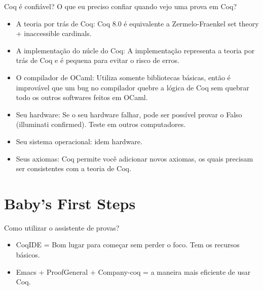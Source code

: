 \documentclass[presentation]{beamer}
\begin{document}
\begin{frame}[label={sec:orgd3a054b}]{Coq é confiável?}
O que eu preciso confiar quando vejo uma prova em Coq? 
\begin{itemize}
\item \alert{A teoria por trás de Coq}: Coq 8.0 é equivalente a Zermelo-Fraenkel set theory + inaccessible cardinals.
\item \alert{A implementação do núcle do Coq}: A implementação representa a teoria por trás de Coq e é pequena para evitar o risco de erros.
\item \alert{O compilador de OCaml}: Utiliza somente bibliotecas básicas, então é improvável que um bug no compilador quebre a lógica de Coq sem quebrar todo os outros softwares feitos em OCaml.
\item \alert{Seu hardware}: Se o seu hardware falhar, pode ser possível provar o Falso (illuminati confirmed). Teste em outros computadores.
\item \alert{Seu sistema operacional}: idem hardware.
\item \alert{Seus axiomas}: Coq permite você adicionar novos axiomas, os quais precisam ser consistentes com a teoria de Coq.
\end{itemize}
\end{frame}

\section{Baby's First Steps}
\label{sec:orgb0e0217}

\begin{frame}[label={sec:orgeee1876}]{Como utilizar o assistente de provas?}
\begin{itemize}
\item CoqIDE = Bom lugar para começar sem perder o foco. Tem os recursos básicos.
\item Emacs + ProofGeneral + Company-coq = a maneira mais eficiente de usar Coq.
\end{itemize}
\end{frame}
\end{document}
